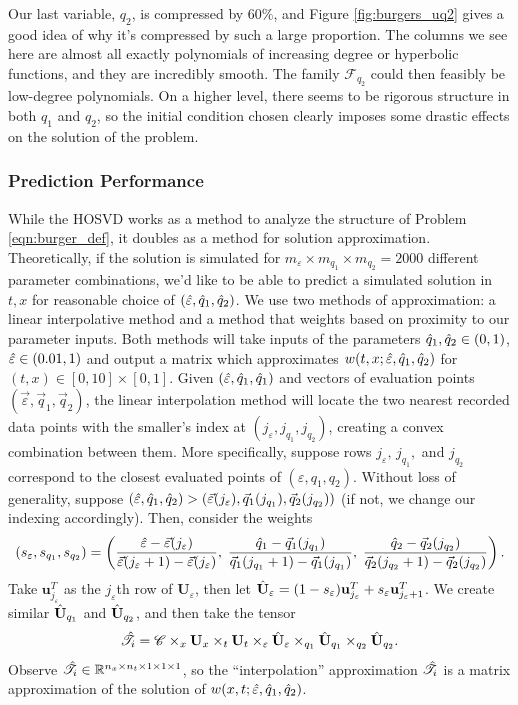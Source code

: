 \documentclass[12pt]{article}
\newcommand{\R}{\mathbb{R}}
\newcommand{\eps}{\varepsilon}
\begin{document}
    Our last variable, $q_2$, is compressed by $60\%$, and Figure \ref{fig:burgers_uq2} gives a good idea of why it's compressed by such a large proportion. The columns we see here are almost all exactly polynomials of increasing degree or hyperbolic functions, and they are incredibly smooth. The family $\mathcal{F}_{q_2}$ could then feasibly be low-degree polynomials. On a higher level, there seems to be rigorous structure in both $q_1$ and $q_2$, so the initial condition chosen clearly imposes some drastic effects on the solution of the problem. 
    
    \subsubsection{Prediction Performance}
    While the HOSVD works as a method to analyze the structure of Problem \ref{eqn:burger_def}, it doubles as a method for solution approximation. Theoretically, if the solution is simulated for $m_{\eps}\times m_{q_1}\times m_{q_2} = 2000$ different parameter combinations, we'd like to be able to predict a simulated solution in $t,x$ for reasonable choice of $(\Hat{\eps}, \Hat{q}_1,\Hat{q}_2)$. We use two methods of approximation: a linear interpolative method and a method that weights based on proximity to our parameter inputs. Both methods will take inputs of the parameters $\Hat{q}_1,\Hat{q}_2\in(0,1)$, $\Hat{\eps}\in (0.01,1)$ and output a matrix which approximates $w(t,x;\Hat{\eps}, \Hat{q}_1,\Hat{q}_2)$ for $(t,x)\in[0,10]\times[0,1]$. Given $(\Hat{\eps},\Hat{q}_1,\Hat{q}_1)$ and vectors of evaluation points $(\vec{\eps},\vec{q}_1,\vec{q}_2)$, the linear interpolation method will locate the two nearest recorded data points with the smaller's index at $(j_\eps, j_{q_1}, j_{q_2})$, creating a convex combination between them. More specifically, suppose rows $j_\eps,\,j_{q_1},$ and $j_{q_2}$ correspond to the closest evaluated points of $(\eps,q_1,q_2)$. Without loss of generality, suppose $(\Hat{\eps}, \Hat{q}_1,\Hat{q}_2) > (\vec{\eps}(j_\eps),\vec{q}_1(j_{q_1}),\vec{q}_2(j_{q_2}))$ (if not, we change our indexing accordingly). Then, consider the weights
        \[(s_\eps, s_{q_1},s_{q_2}) = \left(\frac{\Hat{\eps}-\vec{\eps}(j_\eps)}{\vec{\eps}(j_\eps+1)-\vec{\eps}(j_\eps)},\;\frac{\Hat{q}_1-\vec{q}_1(j_{q_1})}{\vec{q}_1(j_{q_1}+1)-\vec{q}_1(j_{q_1})},\;\frac{\Hat{q}_2-\vec{q}_2(j_{q_2})}{\vec{q}_2(j_{q_2}+1)-\vec{q}_2(j_{q_2})}\right).\]
    Take $\mathbf{u}^T_{j_\eps}$ as the $j_\eps$th row of $\mathbf{U}_\eps$, then let $\Hat{\mathbf{U}}_\eps = (1-s_\eps)\mathbf{u}^T_{j_\eps} + s_\eps\mathbf{u}^T_{j_\eps+1}$. We create similar $\Hat{\mathbf{U}}_{q_1}$ and $\Hat{\mathbf{U}}_{q_2}$, and then take the tensor
        \[\Hat{\mathscr{T}}_i = \mathscr{C}\times_x \mathbf{U}_x\times_t\mathbf{U}_t\times_\eps\Hat{\mathbf{U}}_\eps\times_{q_1}\Hat{\mathbf{U}}_{q_1}\times_{q_2}\Hat{\mathbf{U}}_{q_2}.\]
    Observe $\Hat{\mathscr{T}}_i\in\R^{n_x\times n_t\times 1\times 1\times 1}$, so the ``interpolation'' approximation $\Hat{\mathscr{T}}_i$ is a matrix approximation of the solution of $w(x,t;\Hat{\eps},\Hat{q}_1,\Hat{q}_2)$.
\end{document}
